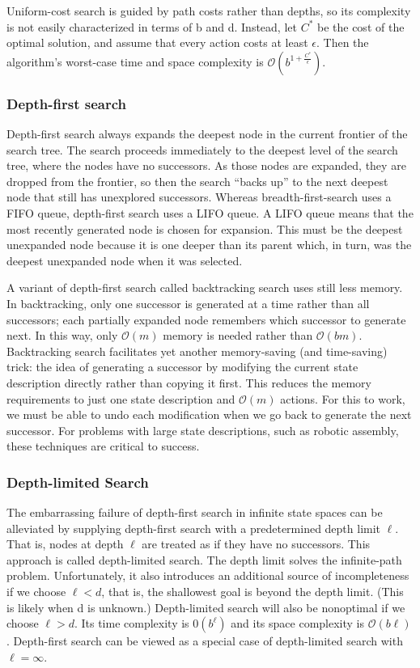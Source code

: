 Uniform-cost search is guided by path costs rather than depths, so its complexity is not easily characterized in terms of b and d. Instead, let $C^*$ be the cost of the optimal solution, and assume that every action costs at least $\epsilon$. Then the algorithm’s worst-case time and space complexity is $\mathcal{O}(b^{1+\frac{C^*}{\epsilon}})$.
\subsubsection{Depth-first search}
Depth-first search always expands the deepest node in the current frontier of the search tree.
The search proceeds immediately to the deepest level of the search tree, where the nodes have no successors. As those nodes are expanded, they are dropped from the frontier, so then the search “backs up” to the next deepest node that still has unexplored successors.
Whereas breadth-first-search uses a FIFO queue, depth-first search uses a LIFO queue.
A LIFO queue means that the most recently generated node is chosen for expansion. This must be the deepest unexpanded node because it is one deeper than its parent which, in turn, was the deepest unexpanded node when it was selected.


A variant of depth-first search called backtracking search uses still less memory. In backtracking, only one successor is generated at a time rather than all successors; each partially expanded node remembers which successor to generate next. In this way, only $\mathcal{O}(m)$ memory is needed rather than $\mathcal{O}(bm)$. Backtracking search facilitates yet another memory-saving (and time-saving) trick: the idea of generating a successor by modifying the current state description directly rather than copying it first. This reduces the memory requirements to just one state description and $\mathcal{O}(m)$ actions. For this to work, we must be able to undo each modification when we go back to generate the next successor. For problems with large state descriptions, such as robotic assembly, these techniques are critical to success.

\subsubsection{Depth-limited Search}

The embarrassing failure of depth-first search in infinite state spaces can be alleviated by supplying depth-first search with a predetermined depth limit $\ell$. That is, nodes at depth $\ell$ are  treated as if they have no successors. This approach is called depth-limited search. The depth limit solves the infinite-path problem. Unfortunately, it also introduces an additional source of incompleteness if we choose $\ell < d$, that is, the shallowest goal is beyond the depth limit. (This is likely when d is unknown.) Depth-limited search will also be nonoptimal if we choose $\ell > d$. Its time complexity is $\mathcal{0}(b^{\ell})$ and its space complexity is $\mathcal{O} (b\ell)$.
 Depth-first search can be viewed as a special case of depth-limited search with $\ell=\infty$.


